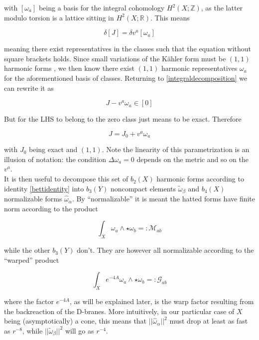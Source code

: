 with $[\omega_a]$ being a basis for the integral cohomology $H^2(X;\mathbb Z)$, as the latter modulo torsion is a lattice sitting in $H^2(X;\mathbb R)$. This means

\begin{equation}
	\delta [J] = \delta v^a [\omega_a]
\end{equation}

meaning there exist representatives in the classes such that the equation without square brackets holds. Since small variations of the K\"ahler form must be $(1,1)$ harmonic forms \cite{CANDELAScy}, we then know there exist $(1,1)$ harmonic representatives $\omega_a$ for the aforementioned basis of classes. Returning to \ref{integraldecomposition} we can rewrite it as

\begin{equation}
	J - v^a \omega_a \in [0]
\end{equation}

But for the LHS to belong to the zero class just means to be exact. Therefore

\begin{equation}
	J = J_0 + v^a \omega_a \label{JandJ0}
\end{equation}

with $J_0$ being exact and $(1,1)$. Note the linearity of this parametrization is an illusion of notation: the condition $\Delta \omega_a = 0$ depends on the metric and so on the $v^a$.\\

It is then useful to decompose this set of $b_2(X)$ harmonic forms according to identity \ref{bettidentity} into $b_3(Y)$ noncompact elements $\tilde\omega_\beta$ and $b_4(X)$ normalizable forms $\hat\omega_\alpha$. By ``normalizable'' it is meant the hatted forms have finite norm according to the product

\begin{equation}
	\int_X \omega_a \wedge \star \omega_b =: \mathcal{M}_{ab} \label{defM}
\end{equation}

while the other $b_3(Y)$ don't. They are however all normalizable according to the ``warped'' product

\begin{equation}
	\int_X e^{-4A} \omega_a \wedge \star \omega_b =: \mathcal{G}_{ab} \label{defG}
\end{equation}

where the factor $e^{-4A}$, as will be explained later, is the warp factor resulting from the backreaction of the D-branes. More intuitively, in our particular case of $X$ being (asymptotically) a cone, this means that $||\hat\omega_\alpha||^2$ must drop at least as fast as $r^{-8}$, while $||\tilde\omega_\beta||^2$ will go as $r^{-4}$.\\

